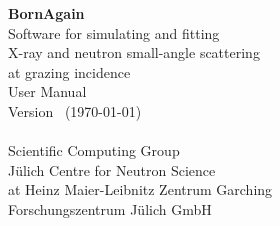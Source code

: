 


\thispagestyle{empty}
\strut\vspace{10mm}
\begin{center}
\Huge
{\bf BornAgain}\\[10mm]
\Large
Software for simulating and fitting\\[.2ex]
X-ray and neutron small-angle scattering\\[.2ex]
at grazing incidence\\[15mm]
User Manual\\[5mm]
\large
Version \UserManualVersionNumber\ (\today)\\[30mm]
\Large
\authors\\[10mm]
\large
Scientific Computing Group\\[.2ex]
J\"ulich Centre for Neutron Science\\[.2ex]
at Heinz Maier-Leibnitz Zentrum Garching\\[.2ex]
Forschungszentrum J\"ulich GmbH
\end{center}
\newpage



